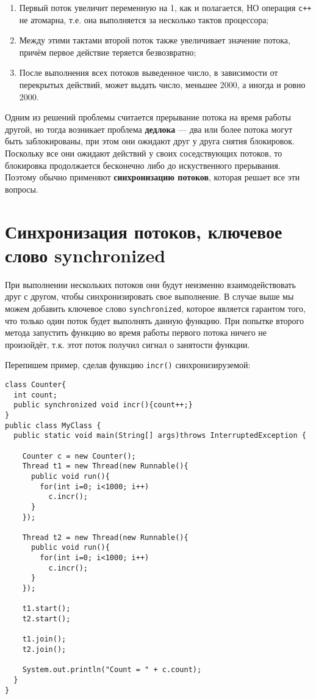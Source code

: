 \begin{enumerate}
    \item Первый поток увеличит переменную на 1, как и полагается, НО операция \verb|c++| не атомарна, т.е. она выполняется за несколько тактов процессора;
    \item Между этими тактами второй поток также увеличивает значение потока, причём первое действие теряется безвозвратно;
    \item После выполнения всех потоков выведенное число, в зависимости от перекрытых действий, может выдать число, меньшее 2000, а иногда и ровно 2000.
\end{enumerate}

Одним из решений проблемы считается прерывание потока на время работы другой, но тогда возникает проблема \textbf{дедлока} — два или более потока могут быть заблокированы, при этом они ожидают друг у друга снятия блокировок. Поскольку все они ожидают действий у своих соседствующих потоков, то блокировка продолжается бесконечно либо до искуственного прерывания. Поэтому обычно применяют \textbf{синхронизацию потоков}, которая решает все эти вопросы.

\section{Синхронизация потоков, ключевое слово synchronized}

При выполнении нескольких потоков они будут неизменно взаимодействовать друг с другом, чтобы синхронизировать свое выполнение. В случае выше мы можем добавить ключевое слово \verb|synchronized|, которое является гарантом того, что только один поток будет выполнять данную функцию. При попытке второго метода запустить функцию во время работы первого потока ничего не произойдёт, т.к. этот поток получил сигнал о занятости функции.

Перепишем пример, сделав функцию \verb|incr()| синхронизируземой:

\begin{lstlisting}
class Counter{
  int count;
  public synchronized void incr(){count++;}
}
public class MyClass {
  public static void main(String[] args)throws InterruptedException {

    Counter c = new Counter();
    Thread t1 = new Thread(new Runnable(){
      public void run(){
        for(int i=0; i<1000; i++)
          c.incr();
      }
    });

    Thread t2 = new Thread(new Runnable(){
      public void run(){
        for(int i=0; i<1000; i++)
          c.incr();
      }
    });

    t1.start();
    t2.start();

    t1.join();
    t2.join();
    
    System.out.println("Count = " + c.count);
  }
}
\end{lstlisting}

